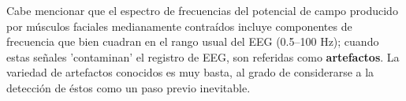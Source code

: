 %
%
%

Cabe mencionar que el espectro de frecuencias del potencial de campo producido por músculos 
faciales medianamente contraídos incluye componentes de frecuencia que bien cuadran en el rango 
usual del EEG (0.5--100 Hz); cuando estas señales 'contaminan' el registro de EEG, son referidas
como \textbf{artefactos}. La variedad de artefactos conocidos es muy basta, al grado de
considerarse a la detección de éstos como un paso previo inevitable.

